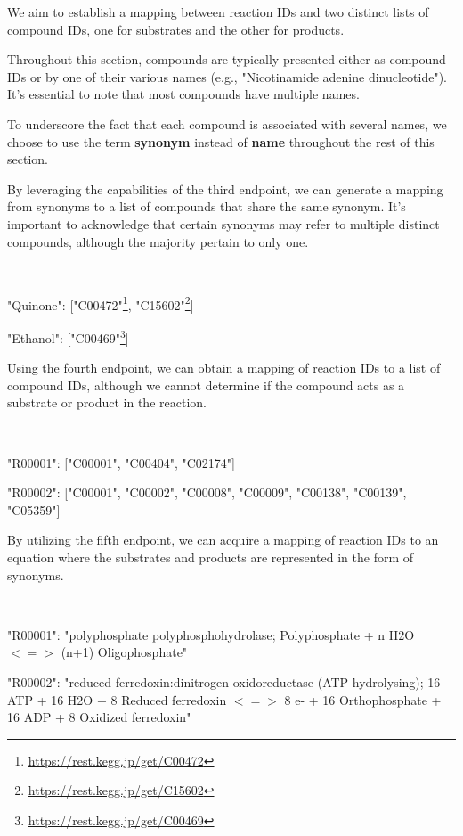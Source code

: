 We aim to establish a mapping between reaction IDs and two distinct lists of compound IDs, one for substrates and the other for products.

Throughout this section, compounds are typically presented either as compound IDs or by one of their various names (e.g., "Nicotinamide adenine dinucleotide"). It's essential to note that most compounds have multiple names.

To underscore the fact that each compound is associated with several names, we choose to use the term \textbf{synonym} instead of \textbf{name} throughout the rest of this section.

By leveraging the capabilities of the third endpoint, we can generate a mapping from synonyms to a list of compounds that share the same synonym. It's important to acknowledge that certain synonyms may refer to multiple distinct compounds, although the majority pertain to only one.
\begin{exmp}~

    "Quinone": ["C00472"\footnote{\href{https://rest.kegg.jp/get/C00472}{https://rest.kegg.jp/get/C00472}}, "C15602"\footnote{\href{https://rest.kegg.jp/get/C15602}{https://rest.kegg.jp/get/C15602}}]
    
    "Ethanol": ["C00469"\footnote{\href{https://rest.kegg.jp/get/C00469}{https://rest.kegg.jp/get/C00469}}]
\end{exmp}

Using the fourth endpoint, we can obtain a mapping of reaction IDs to a list of compound IDs, although we cannot determine if the compound acts as a substrate or product in the reaction.
\begin{exmp}~

    "R00001": ["C00001", "C00404", "C02174"]

    "R00002": ["C00001", "C00002", "C00008", "C00009", "C00138", "C00139", "C05359"]
\end{exmp}

By utilizing the fifth endpoint, we can acquire a mapping of reaction IDs to an equation where the substrates and products are represented in the form of synonyms.
\begin{exmp}~

    "R00001": "polyphosphate polyphosphohydrolase; Polyphosphate + n H2O $<=>$ (n+1) Oligophosphate"
    
    "R00002": "reduced ferredoxin:dinitrogen oxidoreductase (ATP-hydrolysing); 16 ATP + 16 H2O + 8 Reduced ferredoxin $<=>$ 8 e- + 16 Orthophosphate + 16 ADP + 8 Oxidized ferredoxin"
\end{exmp}

